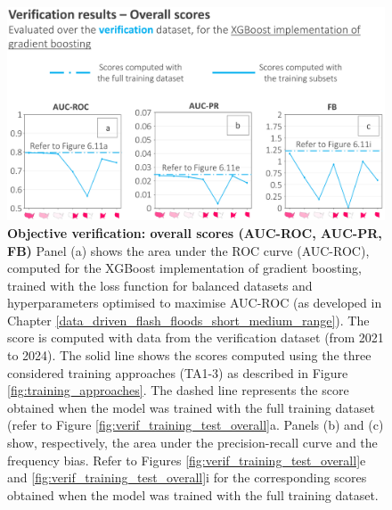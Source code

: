 \begin{figure}[htbp]
\centering
\includegraphics[width=\textwidth]{verif_overall_scores.png}
\caption{\textbf{Objective verification: overall scores (AUC-ROC, AUC-PR, FB)} Panel (a) shows the area under the ROC curve (AUC-ROC), computed for the XGBoost implementation of gradient boosting, trained with the loss function for balanced datasets and hyperparameters optimised to maximise AUC-ROC (as developed in Chapter \ref{data_driven_flash_floods_short_medium_range}). The score is computed with data from the \textcolor{colourTest}{verification} dataset (from 2021 to 2024). The solid line shows the scores computed using the three considered training approaches (TA1-3) as described in Figure \ref{fig:training_approaches}. The dashed line represents the score obtained when the model was trained with the full training dataset (refer to Figure \ref{fig:verif_training_test_overall}a. Panels (b) and (c) show, respectively, the area under the precision-recall curve and the frequency bias. Refer to Figures \ref{fig:verif_training_test_overall}e and \ref{fig:verif_training_test_overall}i for the corresponding scores obtained when the model was trained with the full training dataset.}
\label{fig:verif_overall_scores}
\end{figure}


